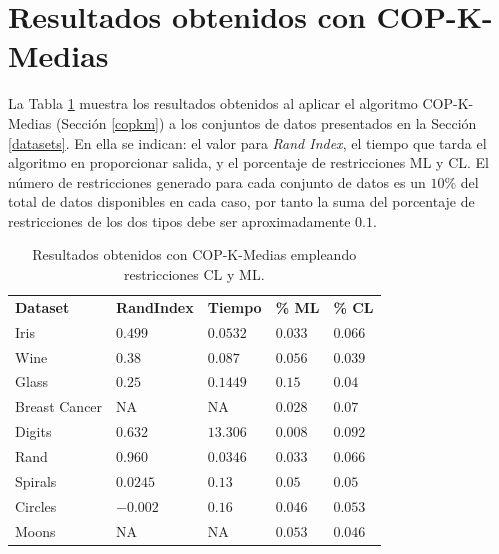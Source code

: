 \section{Resultados obtenidos con COP-K-Medias}

La Tabla \ref{tab:tabla5} muestra los resultados obtenidos al aplicar el algoritmo COP-K-Medias (Sección \ref{copkm}) a los conjuntos de datos presentados en la Sección \ref{datasets}. En ella se indican: el valor para \textit{Rand Index}, el tiempo que tarda el algoritmo en proporcionar salida, y el porcentaje de restricciones \acs{ML} y \acs{CL}. El número de restricciones generado para cada conjunto de datos es un $10\%$ del total de datos disponibles en cada caso, por tanto la suma del porcentaje de restricciones de los dos tipos debe ser aproximadamente $0.1$.

\begin{table}[!h]
	\centering
	\setlength{\arrayrulewidth}{1mm}
	\setlength{\tabcolsep}{10pt}
	\renewcommand{\arraystretch}{0.75}
	
	\begin{tabular}{ >{\centering\arraybackslash}m{2.5cm}  >{\centering\arraybackslash}m{1.8cm}>{\centering\arraybackslash}m{1.5cm}>{\centering\arraybackslash}m{1.2cm}>{\centering\arraybackslash}m{1.2cm}}
		\hline
		\rowcolor{black}
		\multicolumn{5}{c}{\bf \color{white}{Resultados de COP-K-Medias con restricciones CL y ML}}\\
		\hline
		\rowcolor{gray!50}
		\textbf{Dataset} & \textbf{RandIndex} & \textbf{Tiempo} & \textbf{\% ML} & \textbf{\% CL}  \\
		Iris & $0.499$ & $0.0532$ & $0.033$ & $0.066$ \\
		Wine & $0.38$ & $0.087$ & $0.056$ & $0.039$ \\
		Glass  & $0.25$ & $0.1449$ & $0.15$ & $0.04$ \\
		Breast Cancer & NA & NA & $0.028$ & $0.07$ \\ 
		Digits & $0.632$ & $13.306$ & $0.008$ & $0.092$ \\
		Rand & $0.960$ & $0.0346$ & $0.033$ & $0.066$ \\
		Spirals & $0.0245$ & $0.13$ & $0.05$ & $0.05$ \\
		Circles & $-0.002$ & $0.16$ & $0.046$ & $0.053$ \\
		Moons & NA & NA & $0.053$ & $0.046$ \\
		\hline
		
	\end{tabular}
	\caption{Resultados obtenidos con COP-K-Medias empleando restricciones \acs{CL} y \acs{ML}.}
	\label{tab:tabla5}
\end{table}

